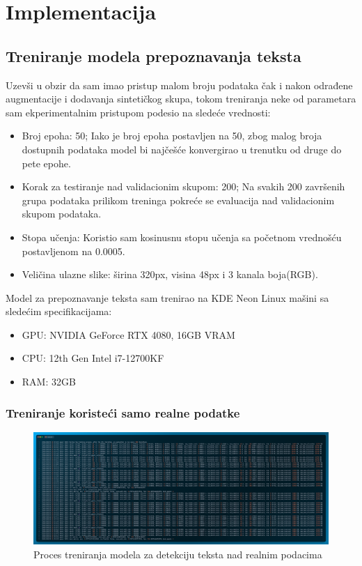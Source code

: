\documentclass[a4paper,12pt]{article}
\begin{document}
	\section{Implementacija}
	\subsection{Treniranje modela prepoznavanja teksta}
	Uzevši u obzir da sam imao pristup malom broju podataka čak i nakon odrađene augmentacije i dodavanja sintetičkog skupa, tokom treniranja neke od parametara sam ekperimentalnim pristupom podesio na sledeće vrednosti:
	\begin{itemize}
		\item Broj epoha: 50; Iako je broj epoha postavljen na 50, zbog malog broja dostupnih podataka model bi najčešće konvergirao u trenutku od druge do pete epohe.
		\item Korak za testiranje nad validacionim skupom: 200; Na svakih 200 završenih grupa podataka prilikom treninga pokreće se evaluacija nad validacionim skupom podataka.
		\item {}Stopa učenja: Koristio sam kosinusnu stopu učenja sa početnom vrednošću postavljenom na 0.0005.
		\item Veličina ulazne slike: širina 320px, visina 48px i 3 kanala boja(RGB).
	\end{itemize}

	Model za prepoznavanje teksta sam trenirao na KDE Neon Linux mašini sa sledećim specifikacijama:
	\begin{itemize}
		\item GPU: NVIDIA GeForce RTX 4080, 16GB VRAM
		\item CPU: 12th Gen Intel i7-12700KF
		\item RAM: 32GB
	\end{itemize}

	\subsubsection{Treniranje koristeći samo realne podatke}
	\begin{figure}[H]
		\centering
		\includegraphics[width=\textwidth]{assets/train-code.png}
		\caption{Proces treniranja modela za detekciju teksta nad realnim podacima}
		\label{fig:train-code}
	\end{figure}
	
\end{document}
